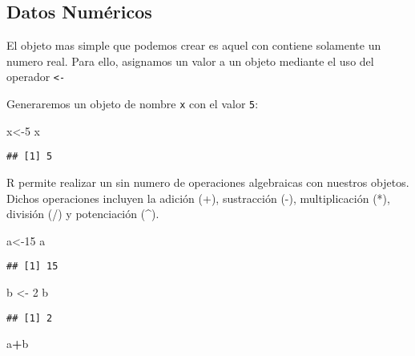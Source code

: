 \documentclass[]{book}
\newenvironment{Shaded}{\begin{snugshade}}{\end{snugshade}}
\newcommand{\DecValTok}[1]{\textcolor[rgb]{0.00,0.00,0.81}{#1}}
\newcommand{\NormalTok}[1]{#1}
\newcommand{\OperatorTok}[1]{\textcolor[rgb]{0.81,0.36,0.00}{\textbf{#1}}}
\newcommand{\StringTok}[1]{\textcolor[rgb]{0.31,0.60,0.02}{#1}}
\begin{document}
\hypertarget{datos-numericos}{%
\subsection{Datos Numéricos}\label{datos-numericos}}

El objeto mas simple que podemos crear es aquel con contiene solamente un numero real. Para ello, asignamos un valor a un objeto mediante el uso del operador \texttt{\textless{}-}

Generaremos un objeto de nombre \texttt{x} con el valor \texttt{5}:

\begin{Shaded}
\begin{Highlighting}[]
\NormalTok{x<-}\DecValTok{5} 
\NormalTok{x}
\end{Highlighting}
\end{Shaded}

\begin{verbatim}
## [1] 5
\end{verbatim}

R permite realizar un sin numero de operaciones algebraicas con nuestros objetos. Dichos operaciones incluyen la adición (+), sustracción (-), multiplicación (*), división (/) y potenciación (\^{}).

\begin{Shaded}
\begin{Highlighting}[]
\NormalTok{a<-}\DecValTok{15}
\NormalTok{a}
\end{Highlighting}
\end{Shaded}

\begin{verbatim}
## [1] 15
\end{verbatim}

\begin{Shaded}
\begin{Highlighting}[]
\NormalTok{b <-}\StringTok{ }\DecValTok{2}
\NormalTok{b}
\end{Highlighting}
\end{Shaded}

\begin{verbatim}
## [1] 2
\end{verbatim}

\begin{Shaded}
\begin{Highlighting}[]
\NormalTok{a}\OperatorTok{+}\NormalTok{b}
\end{Highlighting}
\end{Shaded}
\end{document}
